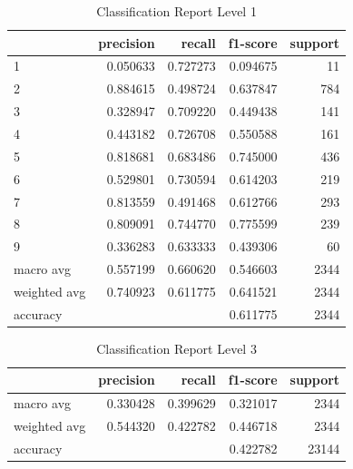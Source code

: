 \documentclass[a4paper]{article}
\begin{document}
\begin{table}
  \begin{center}
  \caption{Classification Report Level 1}
  \label{tab:1}
  \begin{tabular}{lrrrr}
    \hline
  {} &  precision &    recall &  f1-score &      support \\ \hline
  1            &   0.050633 &  0.727273 &  0.094675 &    11 \\
  2            &   0.884615 &  0.498724 &  0.637847 &   784\\
  3            &   0.328947 &  0.709220 &  0.449438 &   141\\
  4            &   0.443182 &  0.726708 &  0.550588 &   161\\
  5            &   0.818681 &  0.683486 &  0.745000 &   436 \\
  6            &   0.529801 &  0.730594 &  0.614203 &   219 \\
  7            &   0.813559 &  0.491468 &  0.612766 &   293 \\
  8            &   0.809091 &  0.744770 &  0.775599 &   239\\
  9            &   0.336283 &  0.633333 &  0.439306 &    60\\
  macro avg    &   0.557199 &  0.660620 &  0.546603 &  2344 \\
  weighted avg &   0.740923 &  0.611775 &  0.641521 &  2344 \\
  \hline
  accuracy     &    &   &       0.611775 & 2344 \\
  \hline
  \end{tabular}
\end{center}
\end{table}


\begin{table}
  \begin{center}
    \label{tab:2}
  \caption{Classification Report Level 3}
  \begin{tabular}{lrrrr}
    \hline
    {} &  precision &    recall &  f1-score &      support \\
    \hline
    macro avg    &   0.330428 &  0.399629 &  0.321017 &  2344 \\
    weighted avg &   0.544320 &  0.422782 &  0.446718 &  2344\\
    \hline
    accuracy     &   &  &  0.422782 &     23144 \\
    \hline
    \end{tabular}
  \end{center}
\end{table}
\end{document}
